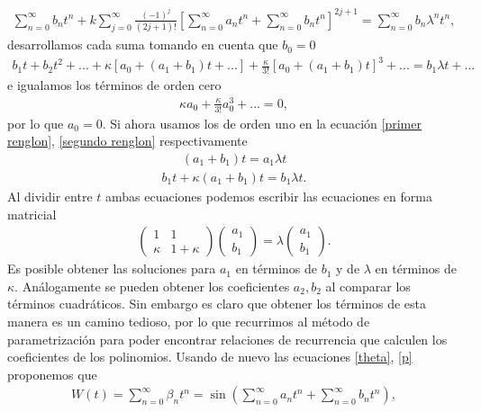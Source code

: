 \begin{eqnarray}
\sum_{n=0}^{\infty}b_{n}t^{n} +k\sum_{j=0}^{\infty}\frac{(-1)^{j}}{(2j+1)!}\left[ \sum_{n=0}^{\infty}a_{n}t^{n} +\sum_{n=0}^{\infty}b_{n}t^{n}\right]^{2j+1}=\sum_{n=0}^{\infty}b_{n}\lambda^{n}t^{n},
\label{seno exapandido 2}
\end{eqnarray}
desarrollamos cada suma tomando en cuenta que $b_{0}=0$
\begin{eqnarray}
b_{1}t+b_{2}t^{2}+...+\kappa\left[a_{0}+(a_{1}+b_{1})t+...\right]+\frac{\kappa}{3!}\left[a_{0}+(a_{1}+b_{1})t\right]^{3}+...=b_{1}\lambda t+...
\label{segundo renglon}
\end{eqnarray}
e igualamos los términos de orden cero
\begin{eqnarray}
\kappa a_{0}+\frac{\kappa}{3!}a_{0}^{3}+...=0, 
\end{eqnarray}
por lo que $a_{0}=0$. Si ahora usamos los de orden uno en la ecuación \ref{primer renglon}, \ref{segundo renglon} respectivamente
\begin{eqnarray}
(a_{1}+b_{1})t=a_{1}\lambda t
\end{eqnarray}
\begin{eqnarray}
b_{1}t+\kappa(a_{1}+b_{1})t=b_{1}\lambda t.
\end{eqnarray}
Al dividir entre $t$ ambas ecuaciones podemos escribir las ecuaciones en forma matricial
\begin{eqnarray}
\begin{pmatrix}
1 & 1\\
\kappa & 1+\kappa
\end{pmatrix}
\begin{pmatrix}
a_{1}\\
b_{1}
\end{pmatrix}=
\lambda \begin{pmatrix}
a_{1}\\
b_{1}
\end{pmatrix}.
\end{eqnarray}
Es posible obtener las soluciones para $a_{1}$ en términos de $b_{1}$ y de $\lambda$ en términos de $\kappa$. Análogamente se pueden obtener los coeficientes $a_{2},b_{2}$ al comparar los términos cuadráticos. Sin embargo es claro que obtener los términos de esta manera es un camino tedioso, por lo que recurrimos al método de parametrización para poder encontrar relaciones de recurrencia que calculen los coeficientes de los polinomios. Usando de nuevo las ecuaciones \ref{theta}, \ref{p} proponemos que 
\begin{eqnarray}
W(t)=\sum_{n=0}^{\infty}\beta_{n}t^{n}=\sin\left(\sum_{n=0}^{\infty}a_{n}t^{n}+\sum_{n=0}^{\infty}
b_{n}t^{n}\right),
\end{eqnarray} 
